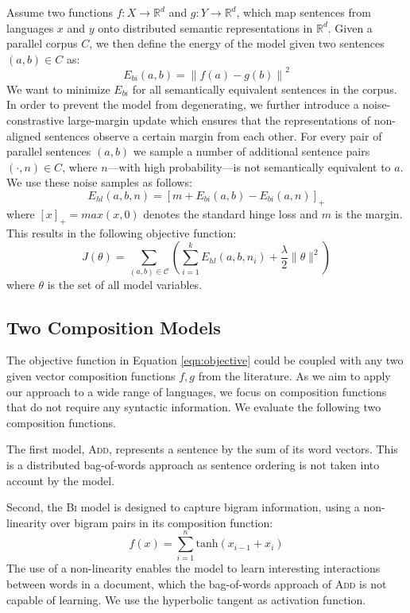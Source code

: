 \documentclass[11pt]{article}
\newcommand{\addMod}{\textsc{Add}\xspace}
\newcommand{\flatMod}{\textsc{Bi}\xspace}
\begin{document}
Assume two functions ${f:X\rightarrow \mathbb{R}^d}$
and ${g:Y\rightarrow \mathbb{R}^d}$, which map sentences from languages $x$ and
$y$ onto distributed semantic representations in $\mathbb{R}^d$. Given a
parallel corpus $C$, we then define the energy of the model given two sentences
$(a,b) \in C$ as:
\begin{equation}
E_{bi}(a,b) = \left\| f(a) - g(b) \right\|^2\label{eqn:bi-error}
\end{equation}
We want to minimize $E_{bi}$ for all semantically equivalent sentences in the
corpus. In order to prevent the model from degenerating, we further introduce a
noise-constrastive large-margin update which ensures that the representations of
non-aligned sentences observe a certain margin from each other.
For every pair of parallel sentences $(a,b)$ we sample a number of additional
sentence pairs $(\cdot,n) \in C$, where $n$---with high probability---is not
semantically equivalent to $a$. We use these noise samples as follows:
\begin{equation}
E_{hl}(a,b,n) = \left[m + E_{bi}(a,b) - E_{bi}(a,n)\right]_{+}\nonumber
\end{equation}
where $[x]_{+} = max(x,0)$ denotes the standard hinge loss and $m$ is the margin.
This results in the following objective function:
\begin{equation}
J(\theta)=\sum_{(a,b) \in \mathcal{C}} \left( \sum_{i=1}^{k} E_{hl}(a,b,n_i) +
  \frac{\lambda}{2}\|\theta\|^2 \right)\label{eqn:objective}
\end{equation}
where $\theta$ is the set of all model variables.

\subsection{Two Composition Models}

The objective function in Equation \ref{eqn:objective} could be
coupled with any two given vector composition functions $f,g$ from the
literature. As we aim to apply our approach to a wide range of languages, we
focus on composition functions that do not require any syntactic information. We
evaluate the following two composition functions.

The first model, \addMod, represents a sentence by the sum of its word vectors.
This is a distributed bag-of-words approach as sentence ordering is not taken
into account by the model.

Second, the \flatMod model is designed to capture bigram information, using a
non-linearity over bigram pairs in its composition function:
\begin{equation}
  f(x) = \sum_{i=1}^{n} \text{tanh}\left(x_{i-1} + x_{i}\right)
\end{equation}
The use of a non-linearity enables the model to learn interesting interactions
between words in a document, which the bag-of-words approach of \addMod is not
capable of learning. We use the hyperbolic tangent as activation function.
\end{document}
